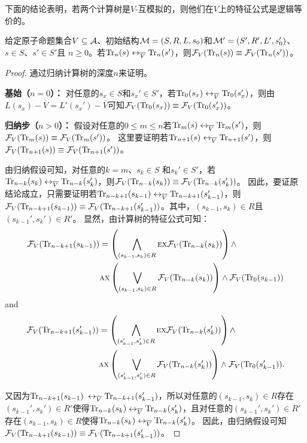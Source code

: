 下面的结论表明，若两个计算树是$V$-互模拟的，则他们在$V$上的特征公式是逻辑等价的。
\begin{lemma}\label{lem:Vb:TrFormula:Equ}
	给定原子命题集合$V\subseteq {\cal A}$、初始结构${\cal M}=(S,R,L,s_0)$和${\cal M}'=(S',R',L',s_0')$、$s\in S$、$s'\in S'$且 $n\ge 0$。若$\textrm{Tr}_n(s) \leftrightarrow_{\overline V} \textrm{Tr}_n(s')$，则${\cal F}_V(\textrm{Tr}_n(s)) \equiv {\cal F}_V(\textrm{Tr}_n(s'))$。
\end{lemma}
\begin{proof}
	通过归纳计算树的深度$n$来证明。
	
	\textbf{基始（$n=0$）：} 对任意的$s_x\in S$和$s_x' \in S'$，若$\textrm{Tr}_0(s_x) \leftrightarrow_{\overline V} \textrm{Tr}_0(s_x')$，则由$L(s_x) - \overline V = L'(s_x') - \overline V$可知${\cal F}_V(\textrm{Tr}_0(s_x)) \equiv {\cal F}_V(\textrm{Tr}_0(s_x'))$。
	
	\textbf{归纳步（$n>0$）：} 假设对任意的$0\leq m \leq n$若$\textrm{Tr}_m(s) \leftrightarrow_{\overline V} \textrm{Tr}_m(s')$，则${\cal F}_V(\textrm{Tr}_m(s)) \equiv {\cal F}_V(\textrm{Tr}_m(s'))$。
	这里要证明若$\textrm{Tr}_{n+1}(s) \leftrightarrow_{\overline V} \textrm{Tr}_{n+1}(s')$，则${\cal F}_V(\textrm{Tr}_{n+1}(s)) \equiv {\cal F}_V(\textrm{Tr}_{n+1}(s'))$。
	
	由归纳假设可知，对任意的$k=m$、$s_k\in S$ 和$s_k'\in S'$，若$\textrm{Tr}_{n-k}(s_k) \leftrightarrow_{\overline V} \textrm{Tr}_{n-k}(s_k')$，则${\cal F}_V(\textrm{Tr}_{n-k}(s_k)) \equiv {\cal F}_V(\textrm{Tr}_{n-k}(s_k'))$。
	因此，要证原结论成立，只需要证明若$\textrm{Tr}_{n-k+1}(s_{k-1}) \leftrightarrow_{\overline V} \textrm{Tr}_{n-k+1}(s_{k-1}')$，则${\cal F}_V(\textrm{Tr}_{n-k+1}(s_{k-1})) \equiv {\cal F}_V(\textrm{Tr}_{n-k+1}(s_{k-1}'))$。其中，$(s_{k-1},s_k)\in R$且$(s_{k-1}',s_k')\in R'$。
	显然，由计算树的特征公式可知：
	\begin{align*}
		{\cal F}_V(\textrm{Tr}_{n-k+1}(s_{k-1})) &  =
		\left(\bigwedge_{(s_{k-1},s_k)\in R}
		\textsc{e} \textsc{x} {\cal F}_V(\textrm{Tr}_{n-k}(s_k))\right)
		\wedge \\
		&\textsc{a} \textsc{x}\left(\bigvee_{(s_{k-1},s_k)\in R}
		{\cal F}_V(\textrm{Tr}_{n-k}(s_k) )\right)
		\wedge {\cal F}_V(\textrm{Tr}_0(s_{k-1}))
	\end{align*}
	and
	\begin{align*}
		{\cal F}_V(\textrm{Tr}_{n-k+1}(s_{k-1}')) &  =
		\left(\bigwedge_{(s_{k-1}',s_k')\in R}
		\textsc{e} \textsc{x} {\cal F}_V(\textrm{Tr}_{n-k}(s_k'))\right)
		\wedge \\
		&\textsc{a} \textsc{x}\left(\bigvee_{(s_{k-1}',s_k')\in R}
		{\cal F}_V(\textrm{Tr}_{n-k}(s_k') )\right)
		\wedge {\cal F}_V(\textrm{Tr}_0(s_{k-1}')).
	\end{align*} 

	又因为$\textrm{Tr}_{n-k+1}(s_{k-1})$ $\leftrightarrow_{\overline V} \textrm{Tr}_{n-k+1}(s_{k-1}')$，所以对任意的$(s_{k-1}, s_k) \in R$存在$(s_{k-1}', s_k') \in R'$使得$\textrm{Tr}_{n-k}(s_k) \leftrightarrow_{\overline V} \textrm{Tr}_{n-k}(s_k')$，且对任意的$(s_{k-1}', s_k') \in R'$存在$(s_{k-1}, s_k) \in R$使得$\textrm{Tr}_{n-k}(s_k) \leftrightarrow_{\overline V} \textrm{Tr}_{n-k}(s_k')$。
	因此，由归纳假设可知${\cal F}_V(\textrm{Tr}_{n-k+1}(s_{k-1})) \equiv {\cal F}_V(\textrm{Tr}_{n-k+1}(s_{k-1}'))$。
\end{proof}

